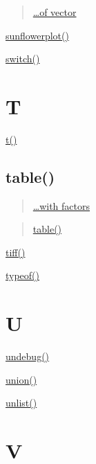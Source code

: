 \documentclass[]{book}
\begin{document}
\begin{quote}
\href{https://linkedin-learning.pxf.io/rwkly_vector}{\ldots{}of vector}
\end{quote}

\href{https://linkedin-learning.pxf.io/rweekly_sunflower}{sunflowerplot()}

\href{https://linkedin-learning.pxf.io/rweekly_switch}{switch()}

\hypertarget{t}{%
\chapter*{T}\label{t}}

\href{https://linkedin-learning.pxf.io/rweekly_matrix}{t()}

\hypertarget{table}{%
\section*{table()}\label{table}}

\begin{quote}
\href{https://linkedin-learning.pxf.io/rweekly_factor}{\ldots{}with factors}
\end{quote}

\begin{quote}
\href{https://linkedin-learning.pxf.io/rweekly_table}{table()}
\end{quote}

\href{linkedin-learning.pxf.io/rweekly_plottofile}{tiff()}

\href{https://linkedin-learning.pxf.io/braclets}{typeof()}

\hypertarget{u}{%
\chapter*{U}\label{u}}

\href{https://linkedin-learning.pxf.io/rweekly_debugonce}{undebug()}

\href{https://linkedin-learning.pxf.io/Rweekly_setsUnionInterDiff}{union()}

\href{https://linkedin-learning.pxf.io/rweekly_unlist}{unlist()}

\hypertarget{v}{%
\chapter*{V}\label{v}}
\end{document}
